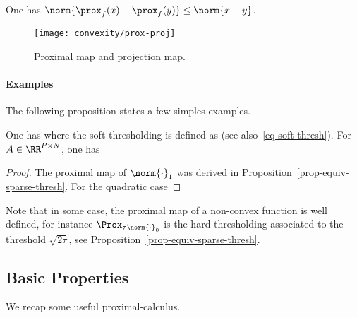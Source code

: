 \begin{prop}
	One has $\norm{ \prox_{f}(x)-\prox_{f}(y) } \leq \norm{x-y}$.
\end{prop}



\begin{figure}
\centering
\texttt{[image: convexity/prox-proj]}
\caption{\label{fig-prox-proj}
Proximal map and projection map.}
\end{figure}


\paragraph{Examples}

The following proposition states a few simples examples.

\begin{prop}
One has
where the soft-thresholding is defined as
(see also~\eqref{eq-soft-thresh}). For $A \in \RR^{P \times N}$, one has
\end{prop}
\begin{proof}
	The proximal map of $\norm{\cdot}_1$ was derived in Proposition~\ref{prop-equiv-sparse-thresh}.
	For the quadratic case
\end{proof}


Note that in some case, the proximal map of a non-convex function is well defined, for instance
$\Prox_{\tau \norm{\cdot}_0}$ is the hard thresholding associated to the threshold $\sqrt{2\tau}$, see Proposition~\ref{prop-equiv-sparse-thresh}.


\subsection{Basic Properties}

We recap some useful proximal-calculus.

